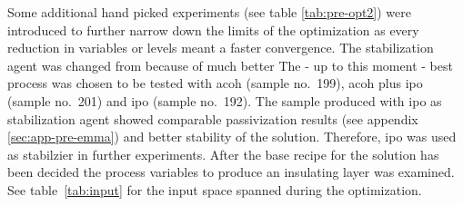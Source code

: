 Some additional hand picked experiments (see table \ref{tab:pre-opt2}) were introduced to further narrow down the limits of 
the optimization as every reduction in variables or levels meant a faster convergence.
The stabilization agent was changed from  because of much better 
The - up to this moment - best process was chosen to be tested with 
 \gls{acoh} (sample no.~199),  \gls{acoh} plus  \gls{ipo} (sample no.~201) and  \gls{ipo} (sample no.~192).
The sample produced with \gls{ipo} as stabilization agent showed comparable passivization results (see appendix \ref{sec:app-pre-emma}) and better stability of the solution. 
Therefore, \gls{ipo} was used  as stabilzier in further experiments.
After the base recipe for the solution has been decided
the process variables to produce an insulating layer was examined. 
See table~\ref{tab:input} for the input space spanned during the optimization.
